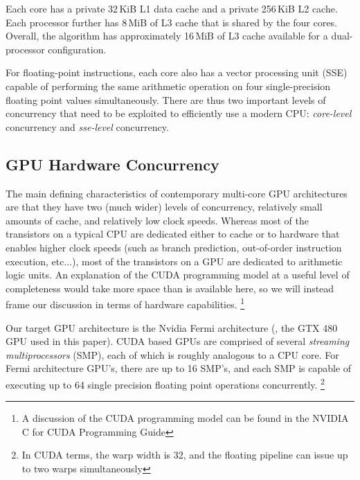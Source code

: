 \documentclass[10pt,twocolumn,letterpaper]{article}
\begin{document}
Each core has a private 32\,KiB L1 data cache and a private 256\,KiB L2 cache.
Each processor further has 8\,MiB of L3 cache that is shared by the four cores.
Overall, the algorithm has approximately 16\,MiB of L3 cache
available for a dual-processor configuration.  

For floating-point instructions, each core also has a vector processing unit
(SSE) capable of performing the same arithmetic operation on four single-precision 
floating point values simultaneously.
There are thus two important levels of concurrency that need to be exploited to
efficiently use a modern CPU: {\em core-level} concurrency and {\em sse-level}
concurrency. 

\subsection{GPU Hardware Concurrency}
The main defining characteristics of contemporary multi-core GPU architectures
are that they have two (much wider) levels of concurrency, relatively small amounts of
 cache, and relatively low clock speeds.  Whereas most of the transistors on
a typical CPU are dedicated either to cache or to hardware that enables higher
clock speeds (such as branch prediction, out-of-order instruction execution, etc...),
most of the transistors on a GPU are dedicated to arithmetic logic units.
An explanation of the CUDA programming model at a useful level of completeness would take 
more space than is available here, so we will instead frame our discussion in terms of 
hardware capabilities. \footnote{A discussion of the CUDA programming model can be found
in the NVIDIA C for CUDA Programming Guide}

Our target GPU architecture is the Nvidia Fermi architecture (\eg, the GTX 480
GPU used in this paper).  CUDA based GPUs are comprised of several
\emph{streaming multiprocessors} (SMP), each of which is roughly analogous to a CPU core.
For Fermi architecture GPU's, there are up to 16 SMP's, and each SMP is capable of executing up to 64 single precision 
floating point operations
concurrently. \footnote{In CUDA terms, the warp width is 32, and the floating pipeline can
issue up to two warps simultaneously}
\end{document}
